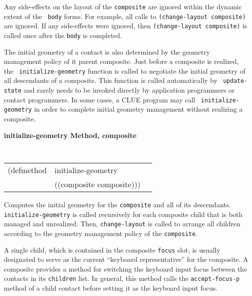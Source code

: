 \begin{flushright} \parbox[t]{6.125in}{ 
Any side-effects on the layout
of the {\tt composite} are ignored within the dynamic extent of the {\tt
body} forms.  For example, all calls to {\tt (change-layout composite)}
are ignored. If any side-effects were ignored, then {\tt (change-layout
composite)} is called once after the {\tt body} is completed.

}\end{flushright}



The initial geometry of a contact is also determined by the geometry management
policy of it parent composite.  Just before a composite is realized, the {\tt
initialize-geometry} function is called to negotiate the initial geometry of all
descendants of a composite.  This function is called automatically by {\tt
update-state}
and rarely needs to be invoked directly by application programmers
or contact programmers.  In some cases, a CLUE program may call {\tt
initialize-geometry} in order to complete initial geometry management without
realizing a composite.

{\samepage
{\large {\bf initialize-geometry \hfill Method, composite}}
\begin{flushright} \parbox[t]{6.125in}{
\tt
\begin{tabular}{lll}
\raggedright
(defmethod & initialize-geometry & \\
           & ((composite  composite)))
\end{tabular}
\rm

}\end{flushright}}

\begin{flushright} \parbox[t]{6.125in}{
Computes the initial geometry for the {\tt composite} and all of its
descendants. {\tt initialize-geometry} is called recursively for each composite
child that
is both managed and unrealized. Then, {\tt change-layout} is called to arrange
all children according to the geometry management policy of the {\tt composite}.

}\end{flushright}

 
{\samepage
{}
A single child, which is contained in the
composite {\tt focus} slot, is usually designated to serve as the current
``keyboard representative'' for the composite. 
A composite provides a method for switching the keyboard input focus
between
the contacts in its {\tt children} list. In general, this method calls the
{\tt accept-focus-p}
method of a child contact before setting it as the keyboard
input focus.
}

